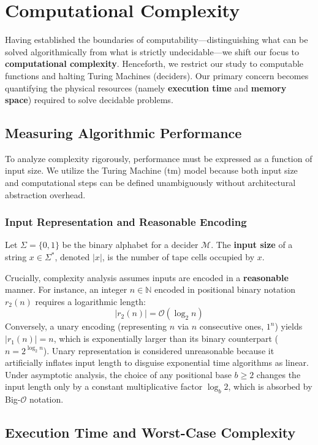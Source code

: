 \chapter{Computational Complexity}
\label{ch:computational_complexity}

Having established the boundaries of computability—distinguishing what can be solved algorithmically from what is strictly undecidable—we shift our focus to \textbf{computational complexity}. Henceforth, we restrict our study to computable functions and halting Turing Machines (deciders). Our primary concern becomes quantifying the physical resources (namely \textbf{execution time} and \textbf{memory space}) required to solve decidable problems.

\section{Measuring Algorithmic Performance}
To analyze complexity rigorously, performance must be expressed as a function of input size. We utilize the Turing Machine (\gls{tm}) model because both input size and computational steps can be defined unambiguously without architectural abstraction overhead.

\subsection{Input Representation and Reasonable Encoding}
Let $\Sigma = \{0, 1\}$ be the binary alphabet for a decider $\mathcal{M}$. The \textbf{input size} of a string $x \in \Sigma^*$, denoted $|x|$, is the number of tape cells occupied by $x$. 

Crucially, complexity analysis assumes inputs are encoded in a \textbf{reasonable} manner. For instance, an integer $n \in \mathbb{N}$ encoded in positional binary notation $r_2(n)$ requires a logarithmic length:
\[
|r_2(n)| = \mathcal{O}(\log_2 n)
\]
Conversely, a unary encoding (representing $n$ via $n$ consecutive ones, $1^n$) yields $|r_1(n)| = n$, which is exponentially larger than its binary counterpart ($n = 2^{\log_2 n}$). Unary representation is considered unreasonable because it artificially inflates input length to disguise exponential time algorithms as linear. Under asymptotic analysis, the choice of any positional base $b \ge 2$ changes the input length only by a constant multiplicative factor $\log_b 2$, which is absorbed by Big-$\mathcal{O}$ notation.

\section{Execution Time and Worst-Case Complexity}

